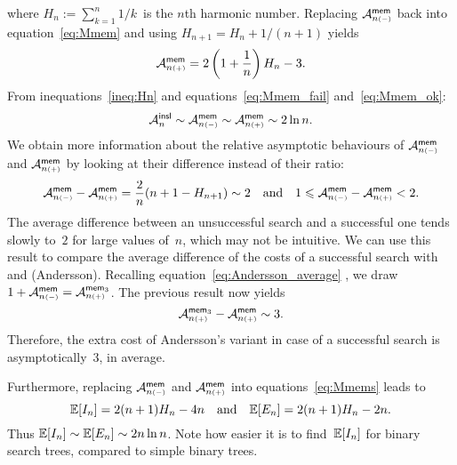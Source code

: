 where \(H_n := \sum_{k=1}^{n}1/k\)~is the \(n\)th harmonic
number. Replacing
\(\M{\fun{mem}}{n{\scriptscriptstyle (-)}}\) back into
equation~\eqref{eq:Mmem} and using \(H_{n+1} = H_n + 1/(n+1)\) yields
\begin{equation}
\M{\fun{mem}}{n{\scriptscriptstyle (+)}} =
2\left(1+\frac{1}{n}\right)H_n - 3.
\index{mem@$\M{\fun{mem}}{n{\scriptscriptstyle (+)}}$}
\label{eq:Mmem_ok}
\end{equation}
From inequations~\eqref{ineq:Hn}  and
equations~\eqref{eq:Mmem_fail} and~\eqref{eq:Mmem_ok}:
\begin{equation*}
\M{\fun{insl}}{n}
\sim \M{\fun{mem}}{n{\scriptscriptstyle (-)}}
\sim \M{\fun{mem}}{n{\scriptscriptstyle (+)}} \sim 2 \ln n.
\end{equation*}
We obtain more information about the relative asymptotic behaviours of
\(\M{\fun{mem}}{n{\scriptscriptstyle(-)}}\) and
\(\M{\fun{mem}}{n{\scriptscriptstyle(+)}}\) by looking at their
difference instead of their ratio:
\begin{equation*}
\M{\fun{mem}}{n{\scriptscriptstyle (-)}} -
\M{\fun{mem}}{n{\scriptscriptstyle (+)}} = 
\frac{2}{n}(n + 1 - H_{n+1}) \sim 2
\quad\text{and}\quad
1 \leqslant \M{\fun{mem}}{n{\scriptscriptstyle (-)}} -
\M{\fun{mem}}{n{\scriptscriptstyle (+)}} < 2.
\end{equation*}
The average difference between an unsuccessful search and a successful
one tends slowly to~\(2\) for large values of~\(n\), which may not be
intuitive. We can use this result to compare the average difference of
the costs of a successful search with  and
 (Andersson). Recalling
equation~\eqref{eq:Andersson_average} ,
we draw \(1 + \M{\fun{mem}}{n{\scriptscriptstyle (-)}} =
\M{\fun{mem}_3}{n{\scriptscriptstyle (+)}}\). The previous result now
yields
\begin{equation*}
  \M{\fun{mem}_3}{n{\scriptscriptstyle (+)}} -
  \M{\fun{mem}}{n{\scriptscriptstyle (+)}} \sim 3.
\index{mem3@$\M{\fun{mem}_3}{n{\scriptscriptstyle (+)}}$}
\end{equation*}
Therefore, the extra cost of Andersson's variant in case of a
successful search is asymptotically~\(3\), in average.

Furthermore, replacing \(\M{\fun{mem}}{n{\scriptscriptstyle
    (-)}}\) and \(\M{\fun{mem}}{n{\scriptscriptstyle (+)}}\) into
equations~\eqref{eq:Mmems} leads to
\begin{equation}
\Expected{I_n} = 2(n+1)H_n - 4n
\quad\text{and}\quad
\Expected{E_n} = 2(n+1)H_n - 2n.
\label{eq:IEn}
\end{equation}
Thus \(\Expected{I_n} \sim \Expected{E_n} \sim 2n\ln n\). Note how
easier it is to find~\(\Expected{I_n}\) for binary search trees,
compared to simple binary trees.

